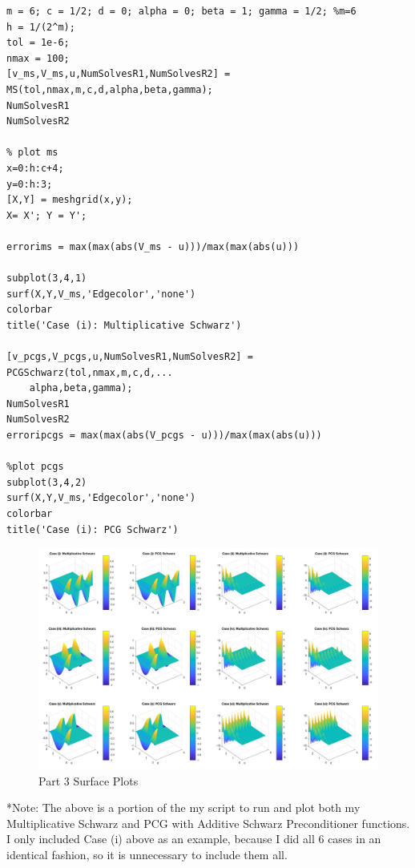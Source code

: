 \documentclass[12pt]{article}
\begin{document}
\newpage
\lstset{language=matlab,frame=single}
\begin{lstlisting}[caption=Part 3 Example Run]
% case(i): c=1/2, d=0, alpha=0, beta=1, gamma=1/2
m = 6; c = 1/2; d = 0; alpha = 0; beta = 1; gamma = 1/2; %m=6
h = 1/(2^m);
tol = 1e-6;
nmax = 100;
[v_ms,V_ms,u,NumSolvesR1,NumSolvesR2] = MS(tol,nmax,m,c,d,alpha,beta,gamma);
NumSolvesR1
NumSolvesR2

% plot ms
x=0:h:c+4;
y=0:h:3; 
[X,Y] = meshgrid(x,y);
X= X'; Y = Y';

errorims = max(max(abs(V_ms - u)))/max(max(abs(u)))

subplot(3,4,1) 
surf(X,Y,V_ms,'Edgecolor','none')
colorbar
title('Case (i): Multiplicative Schwarz')

[v_pcgs,V_pcgs,u,NumSolvesR1,NumSolvesR2] = PCGSchwarz(tol,nmax,m,c,d,...
    alpha,beta,gamma);
NumSolvesR1
NumSolvesR2
erroripcgs = max(max(abs(V_pcgs - u)))/max(max(abs(u)))

%plot pcgs
subplot(3,4,2)
surf(X,Y,V_ms,'Edgecolor','none')
colorbar
title('Case (i): PCG Schwarz')
\end{lstlisting}

\begin{figure}[H]
\hspace{-1in}
\includegraphics[scale=.25]{Part3_graphs.jpg}
\caption{Part 3 Surface Plots}
\end{figure}
*Note: The above is a portion of the my script to run and plot both my Multiplicative Schwarz and PCG with Additive Schwarz Preconditioner functions.  I only included Case (i) above as an example, because I did all 6 cases in an identical fashion, so it is unnecessary to include them all.
\end{document}
